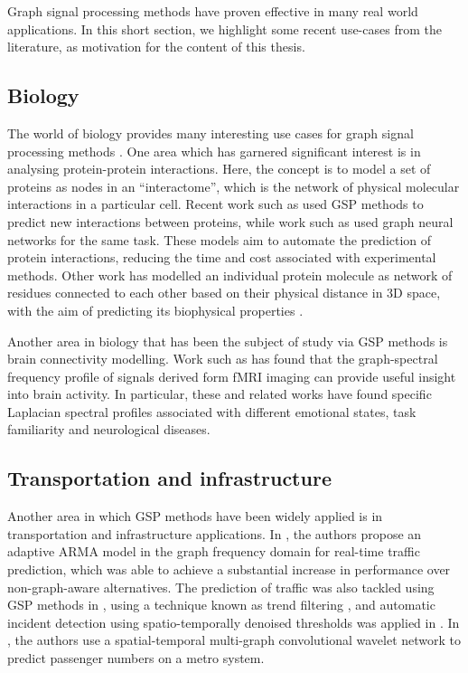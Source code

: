 Graph signal processing methods have proven effective in many real world applications. In this short section, we highlight some recent use-cases from the literature, as motivation for the content of this thesis. 

\subsection{Biology}

The world of biology provides many interesting use cases for graph signal processing methods \citep{Li2023}. One area which has garnered significant interest is in analysing protein-protein interactions. Here, the concept is to model a set of proteins as nodes in an ``interactome'', which is the network of physical molecular interactions in a particular cell. Recent work such as \cite{Colonnese2021} used GSP methods to predict new interactions between proteins, while work such as \cite{Jha2022} used graph neural networks for the same task. These models aim to automate the prediction of protein interactions, reducing the time and cost associated with experimental methods. Other work has modelled an individual protein molecule as network of residues connected to each other based on their physical distance in 3D space, with the aim of predicting its biophysical properties \citep{Srivastava2023}. 

Another area in biology that has been the subject of study via GSP methods is brain connectivity modelling. Work such as \cite{Goldsberry2017,Atasoy2016,Menoret2017,Itani2021} has found that the graph-spectral frequency profile of signals derived form fMRI imaging can provide useful insight into brain activity. In particular, these and related works have found specific Laplacian spectral profiles associated with different emotional states, task familiarity and neurological diseases. 

\subsection{Transportation and infrastructure}

Another area in which GSP methods have been widely applied is in transportation and infrastructure applications. In \cite{Hasanzadeh2017}, the authors propose an adaptive ARMA model in the graph frequency domain for real-time traffic prediction, which was able to achieve a substantial increase in performance over non-graph-aware alternatives. The prediction of traffic was also tackled using GSP methods in \cite{Chakraborty2017}, using a technique known as trend filtering \citep{Wang2016}, and automatic incident detection using spatio-temporally denoised thresholds was applied in \citep{Chakraborty2019}. In \cite{Xiu2022}, the authors use a spatial-temporal multi-graph convolutional wavelet network to predict passenger numbers on a metro system. 

